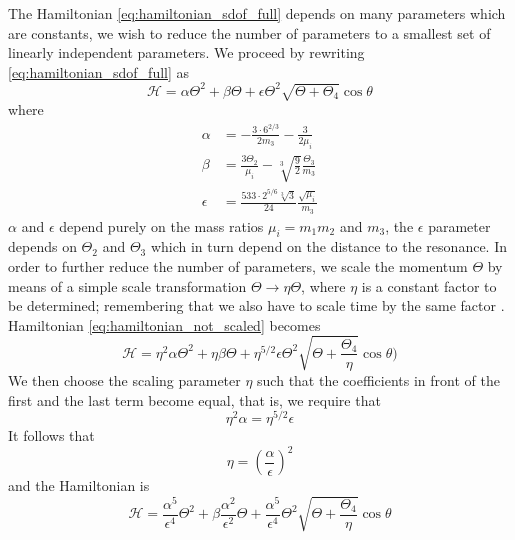 The Hamiltonian \ref{eq:hamiltonian_sdof_full} depends on many parameters
which are constants, we wish to reduce the number of parameters to a 
smallest set of linearly independent parameters. We proceed by rewriting
\cref{eq:hamiltonian_sdof_full} as
\begin{equation}
    \mathcal{H}=\alpha\Theta^2+\beta\Theta +\epsilon\Theta^2\sqrt{\Theta+\Theta_4}
    \cos\theta
    \label{eq:hamiltonian_not_scaled}
\end{equation}
where
\begin{equation}
    \begin{aligned}
        \alpha&= - \frac{3\cdot 6^{2/3}}{2m_3} - \frac{3}{2\mu_i}\\
        \beta&=\frac{3\Theta_2 }{\mu_i}
          -\sqrt[3]{\frac{9}{2}}\frac{\Theta_3}{m_3} \\
         \epsilon&=\frac{533\cdot 2^{5/6}\sqrt[3]{3}}{24} 
        \frac{\sqrt{\mu_i}}{m_3}    
    \end{aligned}
\end{equation}
$\alpha$ and $\epsilon$ depend purely on the mass ratios $\mu_i=m_1m_2$ and
$m_3$, the $\epsilon$ parameter depends on $\Theta_2$ and $\Theta_3$ which in
turn depend on the distance to the resonance. In order to further reduce the 
number of parameters, we scale the momentum $\Theta$ by means of a 
simple scale transformation $\Theta\rightarrow\eta\Theta$, where
$\eta$ is a constant factor to be determined;
remembering that we also have to scale time by the same factor
. Hamiltonian \ref{eq:hamiltonian_not_scaled} becomes
\begin{equation}
    \mathcal{H}=\eta^2\alpha\Theta^2+\eta\beta\Theta +
    \eta^{5/2}\epsilon\Theta^2\sqrt{\Theta+ \frac{\Theta_4}{\eta}}
    \cos\theta)
\end{equation}
We then choose the scaling parameter $\eta$ such that the coefficients
in front of the first and the last term become equal, that is,
we require that 
\begin{equation}
    \eta^2\alpha=\eta^{5/2}\epsilon
\end{equation}
It follows that 
\begin{equation}
    \eta=\left( \frac{\alpha}{\epsilon} \right)^2
\end{equation}
and the Hamiltonian is
  \begin{equation}
    \mathcal{H}= \frac{\alpha^5}{\epsilon^4} \Theta^2+
      \beta \frac{\alpha^2}{\epsilon^2} \Theta +
    \frac{\alpha^5}{\epsilon^4} \Theta^2\sqrt{\Theta+ \frac{\Theta_4}{\eta}}
    \cos\theta
\end{equation}
